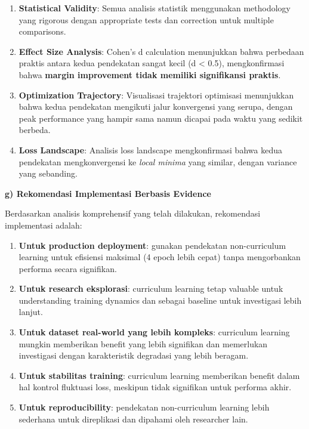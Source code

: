 \documentclass[12pt,a4paper]{article}
\begin{document}
\begin{enumerate}[leftmargin=*]
\item\textbf{Statistical Validity}: Semua analisis statistik menggunakan methodology yang rigorous dengan appropriate tests dan correction untuk multiple comparisons.

\item\textbf{Effect Size Analysis}: Cohen's d calculation menunjukkan bahwa perbedaan praktis antara kedua pendekatan sangat kecil (d < 0.5), mengkonfirmasi bahwa \textbf{margin improvement tidak memiliki signifikansi praktis}.

\item\textbf{Optimization Trajectory}: Visualisasi trajektori optimisasi menunjukkan bahwa kedua pendekatan mengikuti jalur konvergensi yang serupa, dengan peak performance yang hampir sama namun dicapai pada waktu yang sedikit berbeda.

\item\textbf{Loss Landscape}: Analisis loss landscape mengkonfirmasi bahwa kedua pendekatan mengkonvergensi ke \textit{local minima} yang similar, dengan variance yang sebanding.
\end{enumerate}

\textbf{g) Rekomendasi Implementasi Berbasis Evidence}

Berdasarkan analisis komprehensif yang telah dilakukan, rekomendasi implementasi adalah:

\begin{enumerate}[leftmargin=*]
\item\textbf{Untuk production deployment}: gunakan pendekatan non-curriculum learning untuk efisiensi maksimal (4 epoch lebih cepat) tanpa mengorbankan performa secara signifikan.

\item\textbf{Untuk research eksplorasi}: curriculum learning tetap valuable untuk understanding training dynamics dan sebagai baseline untuk investigasi lebih lanjut.

\item\textbf{Untuk dataset real-world yang lebih kompleks}: curriculum learning mungkin memberikan benefit yang lebih signifikan dan memerlukan investigasi dengan karakteristik degradasi yang lebih beragam.

\item\textbf{Untuk stabilitas training}: curriculum learning memberikan benefit dalam hal kontrol fluktuasi loss, meskipun tidak signifikan untuk performa akhir.

\item\textbf{Untuk reproducibility}: pendekatan non-curriculum learning lebih sederhana untuk direplikasi dan dipahami oleh researcher lain.
\end{enumerate}
\end{document}
